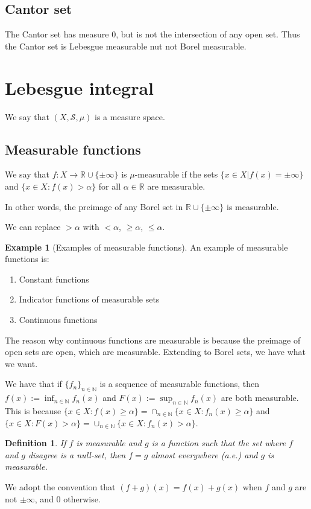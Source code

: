 \documentclass{article}
\newtheorem{definition}[theorem]{Definition}
\theoremstyle{definition}
\newtheorem{example}[theorem]{Example}
\numberwithin{theorem}{section}
\numberwithin{equation}{section}
\begin{document}
\subsection{Cantor set}
The Cantor set has measure 0, but is not the intersection of any open set. Thus the Cantor set is Lebesgue measurable nut not Borel measurable. 

\section{Lebesgue integral}
We say that $(X, \mathcal{S}, \mu)$ is a measure space. 
\subsection{Measurable functions}
We say that $f: X \rightarrow \mathbb{R} \cup \lbrace \pm \infty \rbrace$ is $\mu$-measurable if the sets $\lbrace x \in X | f(x) = \pm \infty \rbrace$ and $\lbrace x \in X : f(x) > \alpha \rbrace$ for all $\alpha \in \mathbb{R}$ are measurable. 

In other words, the preimage of any Borel set in $\mathbb{R} \cup \{\pm \infty\}$ is measurable. 

We can replace $> \alpha$ with $< \alpha$, $\geq \alpha$, $\leq \alpha$.
\begin{example}[Examples of measurable functions]
	An example of measurable functions is:
	\begin{enumerate}
		\item Constant functions
		\item Indicator functions of measurable sets
		\item Continuous functions
	\end{enumerate}
\end{example}
The reason why continuous functions are measurable is because the preimage of open sets are open, which are measurable. Extending to Borel sets, we have what we want. 


We have that if $\lbrace f_n \rbrace_{n \in \mathbb{N}}$ is a sequence of measurable functions, then $f(x) := \inf_{n \in \mathbb{N}} f_n(x)$ and $F(x) := \sup_{n \in \mathbb{N}} f_n(x)$ are both measurable. 
This is because $\lbrace x \in X : f(x) \geq \alpha \rbrace = \cap_{n \in \mathbb{N}} \lbrace x \in X : f_n(x) \geq \alpha \rbrace$ and $\lbrace x \in X : F(x) > \alpha \rbrace = \cup_{n \in \mathbb{N}} \lbrace x \in X : f_n(x) > \alpha \rbrace$.

\begin{definition}
	If $f$ is measurable and $g$ is a function such that the set where $f$ and $g$ disagree is a null-set, then $f = g$ almost everywhere (a.e.) and $g$ is measurable. 
\end{definition} 
We adopt the convention that $(f + g) (x) = f(x) + g(x)$ when $f$ and $g$ are not $\pm \infty$, and 0 otherwise.
\end{document}
